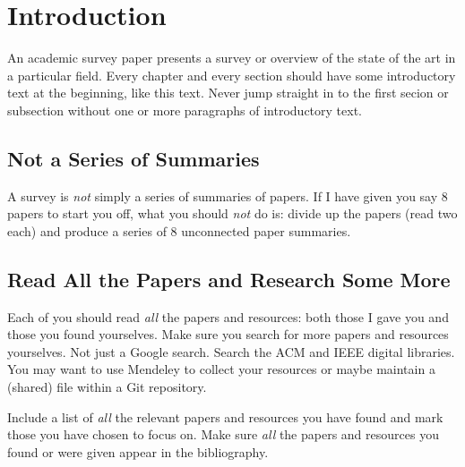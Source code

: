 %
%
% 
% 
% 


\chapter{Introduction}

\label{chap:Intro}



An academic survey paper presents a survey or overview of the state of
the art in a particular field. Every chapter and every section should
have some introductory text at the beginning, like this text. Never
jump straight in to the first secion or subsection without one or more
paragraphs of introductory text.






\section{Not a Series of Summaries}

A survey is \emph{not} simply a series of summaries of papers.
If I have given you say 8 papers to start you off, what you should
\emph{not} do is: divide up the papers (read two each) and produce a
series of 8 unconnected paper summaries.




\section{Read All the Papers and Research Some More}

Each of you should read \emph{all} the papers and resources: both
those I gave you and those you found yourselves.
%
Make sure you search for more papers and resources yourselves. Not
just a Google search. Search the ACM \parencite{ACM-DL} and IEEE
\parencite{IEEE-DL} digital libraries. You may want to use Mendeley to
collect your resources or maybe maintain a (shared)  file
within a Git repository.

Include a list of \emph{all} the relevant papers and resources you
have found and mark those you have chosen to focus on. Make sure
\emph{all} the papers and resources you found or were given appear in
the bibliography.





